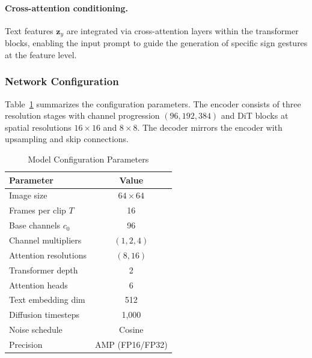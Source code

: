 \documentclass{ieeeaccess}
\begin{document}
\paragraph{Cross-attention conditioning.} Text features $\mathbf{z}_y$ are integrated via cross-attention layers within the transformer blocks, enabling the input prompt to guide the generation of specific sign gestures at the feature level.

\subsubsection{Network Configuration}

Table~\ref{tab:config} summarizes the configuration parameters. The encoder consists of three resolution stages with channel progression $(96, 192, 384)$ and DiT blocks at spatial resolutions $16 \times 16$ and $8 \times 8$. The decoder mirrors the encoder with upsampling and skip connections.

\begin{table}[H]
    \centering
    \caption{Model Configuration Parameters}
    \label{tab:config}
    \renewcommand{\arraystretch}{1.15}
    \begin{tabular}{@{} l c @{}}
        \toprule
        \rowcolor{tableheader}
        \textbf{Parameter} & \textbf{Value} \\
        \midrule
        \rowcolor{tablerow1}
        Image size & $64 \times 64$ \\
        \rowcolor{tablerow2}
        Frames per clip $T$ & 16 \\
        \rowcolor{tablerow1}
        Base channels $c_0$ & 96 \\
        \rowcolor{tablerow2}
        Channel multipliers & $(1, 2, 4)$ \\
        \rowcolor{tablerow1}
        Attention resolutions & $(8, 16)$ \\
        \rowcolor{tablerow2}
        Transformer depth & 2 \\
        \rowcolor{tablerow1}
        Attention heads & 6 \\
        \rowcolor{tablerow2}
        Text embedding dim & 512 \\
        \rowcolor{tablerow1}
        Diffusion timesteps & 1{,}000 \\
        \rowcolor{tablerow2}
        Noise schedule & Cosine \\
        \rowcolor{tablerow1}
        Precision & AMP (FP16/FP32) \\
        \bottomrule
    \end{tabular}
\end{table}
\end{document}
